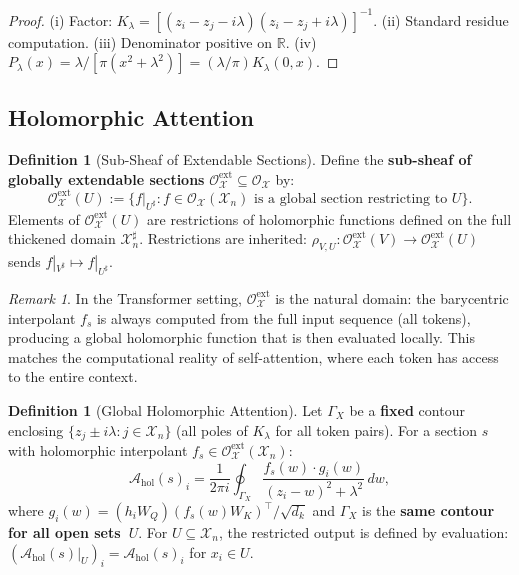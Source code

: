 \documentclass[11pt,a4paper]{article}
\theoremstyle{plain}
\theoremstyle{definition}
\newtheorem{definition}[theorem]{Definition}
\theoremstyle{remark}
\newtheorem{remark}[theorem]{Remark}
\newcommand{\R}{\mathbb{R}}
\newcommand{\cO}{\mathcal{O}}
\newcommand{\cX}{\mathcal{X}}
\newcommand{\cA}{\mathcal{A}}
\begin{document}
\begin{proof}
(i) Factor: $K_\lambda = [(z_i - z_j - i\lambda)(z_i - z_j + i\lambda)]^{-1}$. (ii) Standard residue computation. (iii) Denominator positive on $\R$. (iv) $P_\lambda(x) = \lambda/[\pi(x^2 + \lambda^2)] = (\lambda/\pi) K_\lambda(0,x)$.
\end{proof}

\subsection{Holomorphic Attention}

\begin{definition}[Sub-Sheaf of Extendable Sections]\label{def:ext-sheaf}
Define the \textbf{sub-sheaf of globally extendable sections} $\cO_\cX^{\mathrm{ext}} \subseteq \cO_\cX$ by:
\[
\cO_\cX^{\mathrm{ext}}(U) := \{f|_{U^\sharp} : f \in \cO_\cX(\cX_n) \text{ is a global section restricting to } U\}.
\]
Elements of $\cO_\cX^{\mathrm{ext}}(U)$ are restrictions of holomorphic functions defined on the full thickened domain $\cX_n^\sharp$. Restrictions are inherited: $\rho_{V,U}: \cO_\cX^{\mathrm{ext}}(V) \to \cO_\cX^{\mathrm{ext}}(U)$ sends $f|_{V^\sharp} \mapsto f|_{U^\sharp}$.
\end{definition}

\begin{remark}\label{rem:ext-sheaf}
In the Transformer setting, $\cO_\cX^{\mathrm{ext}}$ is the natural domain: the barycentric interpolant $f_s$ is always computed from the full input sequence (all tokens), producing a global holomorphic function that is then evaluated locally. This matches the computational reality of self-attention, where each token has access to the entire context.
\end{remark}

\begin{definition}[Global Holomorphic Attention]\label{def:hol-attn}
Let $\Gamma_X$ be a \textbf{fixed} contour enclosing $\{z_j \pm i\lambda : j \in \cX_n\}$ (all poles of $K_\lambda$ for all token pairs). For a section $s$ with holomorphic interpolant $f_s \in \cO_\cX^{\mathrm{ext}}(\cX_n)$:
\begin{equation}\label{eq:hol-attn}
\cA_{\mathrm{hol}}(s)_i = \frac{1}{2\pi i}\oint_{\Gamma_X} \frac{f_s(w) \cdot g_i(w)}{(z_i - w)^2 + \lambda^2}\,dw,
\end{equation}
where $g_i(w) = (h_i W_Q)(f_s(w) W_K)^\top / \sqrt{d_k}$ and $\Gamma_X$ is the \textbf{same contour for all open sets~$U$}. For $U \subseteq \cX_n$, the restricted output is defined by evaluation: $(\cA_{\mathrm{hol}}(s)|_U)_i = \cA_{\mathrm{hol}}(s)_i$ for $x_i \in U$.
\end{definition}
\end{document}

